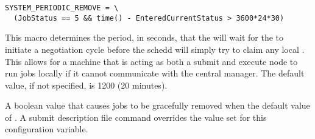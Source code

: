 \begin{description}
\footnotesize
\begin{verbatim}
SYSTEM_PERIODIC_REMOVE = \
  (JobStatus == 5 && time() - EnteredCurrentStatus > 3600*24*30)
\end{verbatim}
\normalsize

\label{param:ScheddAssumeNegotiatorGone}
\item[\Macro{SCHEDD\_ASSUME\_NEGOTIATOR\_GONE}]
  This macro determines the period,
  in seconds, that the  will wait for the  to
  initiate a negotiation cycle before the schedd will simply try to claim
  any local \Condor{startd}.  This allows for a machine that is acting as
  both a submit and execute node to run jobs locally if it cannot
  communicate with the central manager. The default value, if not
  specified, is 1200 (20 minutes).

\label{param:GracefullyRemoveJobs}
\item[\Macro{GRACEFULLY\_REMOVE\_JOBS}]
  A boolean value that causes jobs to be gracefully removed when the
  default value of \Expr{True}.
  A submit description file command 
  overrides the value set for this configuration variable.


\end{description}
